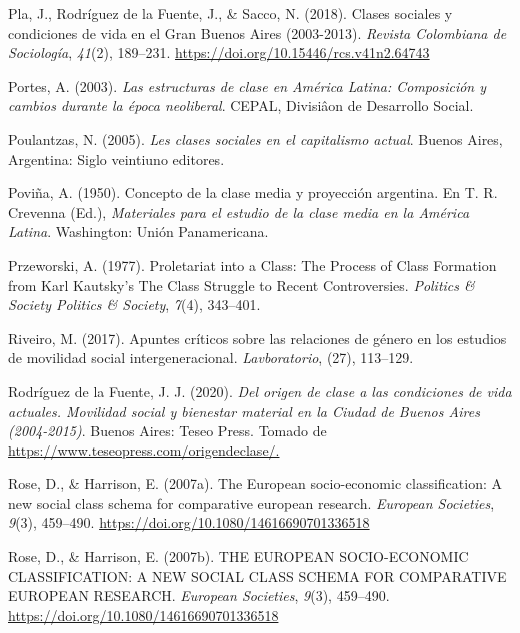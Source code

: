 \documentclass[
]{article}
\newlength{\cslhangindent}
\newlength{\cslentryspacingunit} %
\newenvironment{CSLReferences}[2] %
 {%
  \setlength{\parindent}{0pt}
  \ifodd #1
  \let\oldpar\par
  \def\par{\hangindent=\cslhangindent\oldpar}
  \fi
  \setlength{\parskip}{#2\cslentryspacingunit}
 }%
 {}
\begin{document}
\begin{CSLReferences}{1}{0}
\leavevmode{}%
Pla, J., Rodríguez de la Fuente, J., \& Sacco, N. (2018). Clases sociales y condiciones de vida en el {Gran} {Buenos} {Aires} (2003-2013). \emph{Revista Colombiana de Sociología}, \emph{41}(2), 189--231. \url{https://doi.org/10.15446/rcs.v41n2.64743}

\leavevmode{}%
Portes, A. (2003). \emph{Las estructuras de clase en {América} {Latina}: Composición y cambios durante la época neoliberal}. CEPAL, Divisiâon de Desarrollo Social.

\leavevmode{}%
Poulantzas, N. (2005). \emph{Les clases sociales en el capitalismo actual}. Buenos Aires, Argentina: Siglo veintiuno editores.

\leavevmode{}%
Poviña, A. (1950). Concepto de la clase media y proyección argentina. En T. R. Crevenna (Ed.), \emph{Materiales para el estudio de la clase media en la {América} {Latina}}. Washington: Unión Panamericana.

\leavevmode{}%
Przeworski, A. (1977). Proletariat into a {Class}: {The} {Process} of {Class} {Formation} from {Karl} {Kautsky}'s {The} {Class} {Struggle} to {Recent} {Controversies}. \emph{Politics \& Society Politics \& Society}, \emph{7}(4), 343--401.

\leavevmode{}%
Riveiro, M. (2017). Apuntes críticos sobre las relaciones de género en los estudios de movilidad social intergeneracional. \emph{Lavboratorio}, (27), 113--129.

\leavevmode{}%
Rodríguez de la Fuente, J. J. (2020). \emph{Del origen de clase a las condiciones de vida actuales. {Movilidad} social y bienestar material en la {Ciudad} de {Buenos} {Aires} (2004-2015)}. Buenos Aires: Teseo Press. Tomado de \href{https://www.teseopress.com/origendeclase/}{https://www.teseopress.com/origendeclase/.}

\leavevmode{}%
Rose, D., \& Harrison, E. (2007a). The {European} socio-economic classification: A new social class schema for comparative european research. \emph{European Societies}, \emph{9}(3), 459--490. \url{https://doi.org/10.1080/14616690701336518}

\leavevmode{}%
Rose, D., \& Harrison, E. (2007b). {THE} {EUROPEAN} {SOCIO}-{ECONOMIC} {CLASSIFICATION}: {A} {NEW} {SOCIAL} {CLASS} {SCHEMA} {FOR} {COMPARATIVE} {EUROPEAN} {RESEARCH}. \emph{European Societies}, \emph{9}(3), 459--490. \url{https://doi.org/10.1080/14616690701336518}


\end{CSLReferences}
\end{document}
